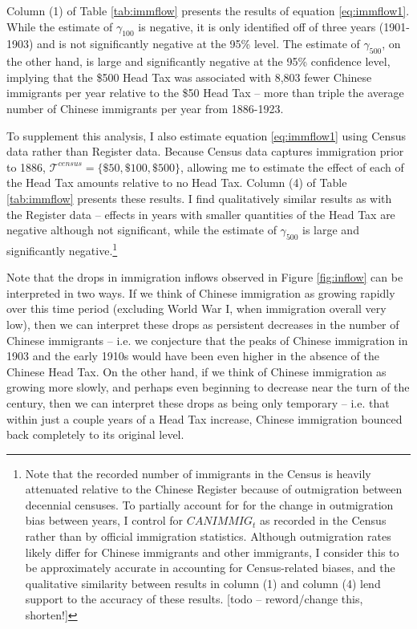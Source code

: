 Column (1) of Table \ref{tab:immflow} presents the results of equation \ref{eq:immflow1}. While the estimate of $\gamma_{100}$ is negative, it is only identified off of three years (1901-1903) and is not significantly negative at the 95\% level. The estimate of $\gamma_{500}$, on the other hand, is large and significantly negative at the 95\% confidence level, implying that the \$500 Head Tax was associated with 8,803 fewer Chinese immigrants per year relative to the \$50 Head Tax -- more than triple the average number of Chinese immigrants per year from 1886-1923.

To supplement this analysis, I also estimate equation \ref{eq:immflow1} using Census data rather than Register data. Because Census data captures immigration prior to 1886, $\mathcal{T}^{census} = \{\$50,\$100,\$500\}$, allowing me to estimate the effect of each of the Head Tax amounts relative to no Head Tax. Column (4) of Table \ref{tab:immflow} presents these results. 
I find qualitatively similar results as with the Register data -- effects in years with smaller quantities of the Head Tax are negative although not significant, while the estimate of $\gamma_{500}$ is large and significantly negative.\footnote{Note that the recorded number of immigrants in the Census is heavily attenuated relative to the Chinese Register because of outmigration between decennial censuses. 
To partially account for for the change in outmigration bias between years, I control for $CANIMMIG_t$ as recorded in the Census rather than by official immigration statistics. Although outmigration rates likely differ for Chinese immigrants and other immigrants, I consider this to be approximately accurate in accounting for Census-related biases, and the qualitative similarity between results in column (1) and column (4) lend support to the accuracy of these results. [todo -- reword/change this, shorten!]}

Note that the drops in immigration inflows observed in Figure \ref{fig:inflow} can be interpreted in two ways. If we think of Chinese immigration as growing rapidly over this time period (excluding World War I, when immigration overall very low), then we can interpret these drops as persistent decreases in the number of Chinese immigrants -- i.e. we conjecture that the peaks of Chinese immigration in 1903 and the early 1910s would have been even higher in the absence of the Chinese Head Tax. On the other hand, if we think of Chinese immigration as growing more slowly, and perhaps even beginning to decrease near the turn of the century, then we can interpret these drops as being only temporary -- i.e. that within just a couple years of a Head Tax increase, Chinese immigration bounced back completely to its original level.


